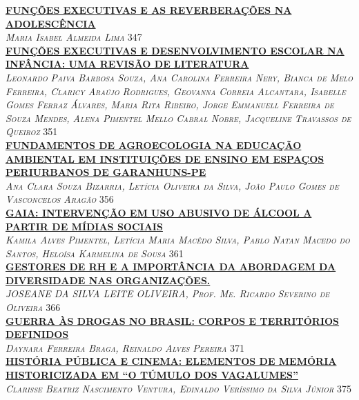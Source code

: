 \noindent \textsc{\hyperlink{trabalhos/251308.pdf.1}{\textbf{FUNÇÕES EXECUTIVAS E AS REVERBERAÇÕES NA ADOLESCÊNCIA}}}\\ 
\noindent \textsc{\textit{Maria Isabel Almeida Lima}} \hfill 347\\ 

\noindent \textsc{\hyperlink{trabalhos/251190.pdf.1}{\textbf{FUNÇÕES EXECUTIVAS E DESENVOLVIMENTO ESCOLAR NA INFÂNCIA: UMA REVISÃO DE LITERATURA}}}\\ 
\noindent \textsc{\textit{Leonardo Paiva Barbosa Souza, Ana Carolina Ferreira Nery, Bianca de Melo Ferreira, Claricy Araújo Rodrigues, Geovanna Correia Alcantara, Isabelle Gomes Ferraz Álvares, Maria Rita Ribeiro, Jorge Emmanuell Ferreira de Souza Mendes, Alena Pimentel Mello Cabral Nobre, Jacqueline Travassos de Queiroz}} \hfill 351\\ 

\noindent \textsc{\hyperlink{trabalhos/250122.pdf.1}{\textbf{FUNDAMENTOS DE AGROECOLOGIA NA EDUCAÇÃO AMBIENTAL EM INSTITUIÇÕES DE ENSINO EM ESPAÇOS PERIURBANOS DE GARANHUNS-PE}}}\\ 
\noindent \textsc{\textit{Ana Clara Souza Bizarria, Letícia Oliveira da Silva, João Paulo Gomes de Vasconcelos Aragão}} \hfill 356\\ 

\noindent \textsc{\hyperlink{trabalhos/249183.pdf.1}{\textbf{GAIA: INTERVENÇÃO EM USO ABUSIVO DE ÁLCOOL A PARTIR DE MÍDIAS SOCIAIS}}}\\ 
\noindent \textsc{\textit{Kamila Alves Pimentel, Letícia Maria Macêdo Silva, Pablo Natan Macedo do Santos, Heloísa Karmelina de Sousa}} \hfill 361\\ 

\noindent \textsc{\hyperlink{trabalhos/250412.pdf.1}{\textbf{GESTORES DE RH E A IMPORTÂNCIA  DA ABORDAGEM DA DIVERSIDADE NAS ORGANIZAÇÕES.}}}\\ 
\noindent \textsc{\textit{JOSEANE DA SILVA LEITE OLIVEIRA, Prof. Me. Ricardo Severino de Oliveira}} \hfill 366\\ 

\noindent \textsc{\hyperlink{trabalhos/251638.pdf.1}{\textbf{GUERRA ÀS DROGAS NO BRASIL: CORPOS E TERRITÓRIOS DEFINIDOS }}}\\ 
\noindent \textsc{\textit{Daynara Ferreira Braga, Reinaldo Alves Pereira}} \hfill 371\\ 

\noindent \textsc{\hyperlink{trabalhos/251587.pdf.1}{\textbf{HISTÓRIA PÚBLICA E CINEMA: ELEMENTOS DE MEMÓRIA HISTORICIZADA EM “O TÚMULO DOS VAGALUMES”}}}\\ 
\noindent \textsc{\textit{Clarisse Beatriz Nascimento Ventura, Edinaldo Veríssimo da Silva Júnior}} \hfill 375\\ 

